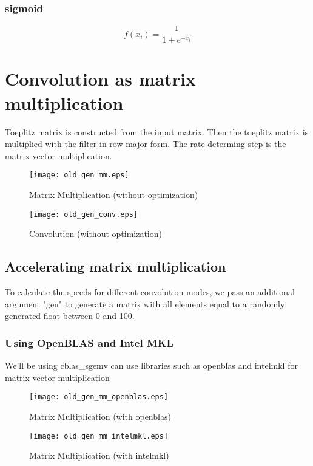 \documentclass{article}
\begin{document}
    \subsubsection{sigmoid}
    $$ f(x_i) = \frac{\mathrm{1}}{\mathrm{1} + e^{-x_i}} $$

    \newpage
    \section{Convolution as matrix multiplication}
    Toeplitz matrix is constructed from the input matrix. Then the toeplitz matrix is multiplied with the filter in row major form. The rate determing step is the matrix-vector multiplication.

    \begin{figure}[!htb]
    \centering
        \texttt{[image: old\_gen\_mm.eps]}
        \caption{Matrix Multiplication (without optimization)}
    \end{figure}
    \begin{figure}[!htb]
    \centering
        \texttt{[image: old\_gen\_conv.eps]}
        \caption{Convolution (without optimization)}
    \end{figure}

    \newpage
    \subsection{Accelerating matrix multiplication}
    To calculate the speeds for different convolution modes, we pass an additional argument "gen" to generate a matrix with all elements equal to a randomly generated float between 0 and 100. \\
    \subsubsection{Using OpenBLAS\cite{openblas} and Intel MKL\cite{intelmkl}}
    We'll be using cblas\_sgemv can use libraries such as openblas and intelmkl for matrix-vector multiplication

    \begin{figure}[!htb]
    \centering
        \texttt{[image: old\_gen\_mm\_openblas.eps]}
        \caption{Matrix Multiplication (with openblas)}
    \end{figure}
    \begin{figure}[!htb]
    \centering
        \texttt{[image: old\_gen\_mm\_intelmkl.eps]}
        \caption{Matrix Multiplication (with intelmkl)}
    \end{figure}
\end{document}
